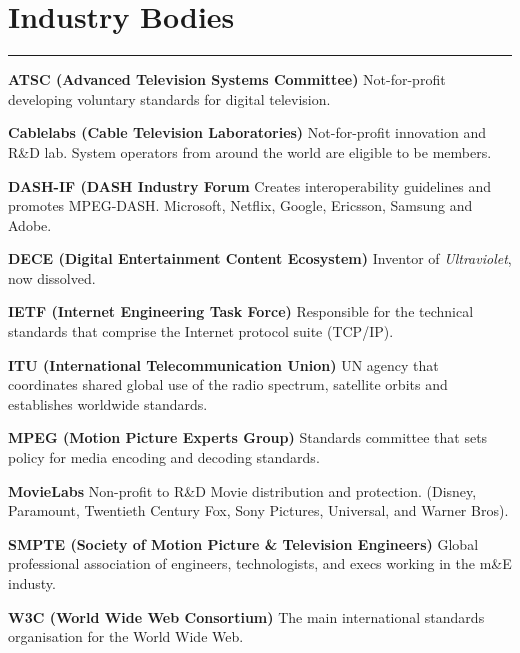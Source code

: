 

\section{Industry Bodies}
\hrule

\medskip
\textbf{ATSC (Advanced Television Systems Committee)}
Not-for-profit developing voluntary standards for digital television.

\smallskip
\textbf{Cablelabs (Cable Television Laboratories)}
Not-for-profit innovation and R\&D lab. System operators from around the world are eligible to be members.

\smallskip
\textbf{DASH-IF (DASH Industry Forum}
Creates interoperability guidelines and promotes MPEG-DASH. Microsoft, Netflix, Google, Ericsson, Samsung and Adobe.

\smallskip
\textbf{DECE (Digital Entertainment Content Ecosystem)}
Inventor of \textit{Ultraviolet}, now dissolved.

\smallskip
\textbf{IETF (Internet Engineering Task Force)}
Responsible for the technical standards that comprise the Internet protocol suite (TCP/IP).

\smallskip
\textbf{ITU (International Telecommunication Union)}
UN agency that coordinates shared global use of the radio spectrum, satellite orbits and establishes worldwide standards.

\smallskip
\textbf{MPEG (Motion Picture Experts Group)}
Standards committee that sets policy for media encoding and decoding standards.

\smallskip
\textbf{MovieLabs}
Non-profit to R\&D Movie distribution and protection. (Disney, Paramount, Twentieth Century Fox, Sony Pictures, Universal, and Warner Bros).

\smallskip
\textbf{SMPTE (Society of Motion Picture \& Television Engineers)}
Global professional association of engineers, technologists, and execs working in the m\&E industy.

\smallskip
\textbf{W3C (World Wide Web Consortium)}
The main international standards organisation for the World Wide Web.
